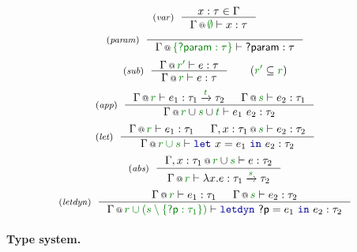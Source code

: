 \begin{figure}[t]
\begin{equation*}
\tyrule{var}
  {x : \tau \in \Gamma}
  {\coctx{\Gamma}{\cclrd{\emptyset}} \vdash x : \tau }
\end{equation*}
\begin{equation*}
\tyrule{param}
  {}
  {\coctx{\Gamma}{\cclrd{ \{\ident{?param}:\tau \} }} \vdash \ident{?param} : \tau }
\end{equation*}
\begin{equation*}
\tyrule{sub}
  {\coctx{\Gamma}{\cclrd{r'}} \vdash e : \tau }
  {\coctx{\Gamma}{\cclrd{r}} \vdash e : \tau }\quad\quad(\cclrd{r'} \subseteq \cclrd{r})
\end{equation*}
\begin{equation*}
\tyrule{app}
  {\coctx{\Gamma}{\cclrd{r}} \vdash e_1 : \tau_1 \xrightarrow{\cclrd{t}} \tau_2 &
   \coctx{\Gamma}{\cclrd{s}} \vdash e_2 : \tau_1 }
  {\coctx{\Gamma}{\cclrd{r} \cup \cclrd{s} \cup \cclrd{t}} \vdash e_1~e_2 : \tau_2}
\end{equation*}
\begin{equation*}
\tyrule{let}
  { \coctx{\Gamma}{\cclrd{r}} \vdash e_1 : \tau_1 &
    \coctx{\Gamma, x:\tau_1}{\cclrd{s}} \vdash e_2 : \tau_2}
  {\coctx{\Gamma}{\cclrd{r \cup s}} \vdash \kvd{let}~x=e_1~\kvd{in}~e_2 : \tau_2 }
\end{equation*}
\begin{equation*}
\tyrule{abs}
  {\coctx{\Gamma, x:\tau_1}{\cclrd{r} \cup \cclrd{s}} \vdash e : \tau_2}
  {\coctx{\Gamma}{\cclrd{r}} \vdash \lambda x.e : \tau_1 \xrightarrow{\cclrd{s}} \tau_2 }
\end{equation*}
\begin{equation*}
\tyrule{letdyn}
  { \coctx{\Gamma}{\cclrd{r}} \vdash e_1 : \tau_1 &
    \coctx{\Gamma}{\cclrd{s}} \vdash e_2 : \tau_2}
  {\coctx{\Gamma}{\cclrd{r \cup (s \setminus \{ \ident{?p}:\tau_1 \})}} \vdash \kvd{letdyn}~\ident{?p}=e_1~\kvd{in}~e_2 : \tau_2 }
\end{equation*}

\label{fig:applications-flat-impl}
\vspace{-1em}
\end{figure}


\paragraph{Type system.}

